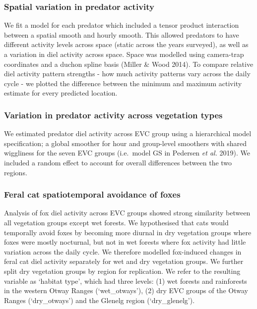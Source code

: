 \documentclass[11pt,a4paper,titlepage,twoside,openright]{style/unimelbthesis}
\begin{document}
\begin{mainmatter}
\hypertarget{spatial-variation-in-predator-activity}{%
\subsubsection{Spatial variation in predator activity}\label{spatial-variation-in-predator-activity}}

We fit a model for each predator which included a tensor product interaction between a spatial smooth and hourly smooth. This allowed predators to have different activity levels across space (static across the years surveyed), as well as a variation in diel activity across space. Space was modelled using camera-trap coordinates and a duchon spline basis (Miller \& Wood 2014). To compare relative diel activity pattern strengths - how much activity patterns vary across the daily cycle - we plotted the difference between the minimum and maximum activity estimate for every predicted location.

\hypertarget{variation-in-predator-activity-across-vegetation-types}{%
\subsubsection{Variation in predator activity across vegetation types}\label{variation-in-predator-activity-across-vegetation-types}}

We estimated predator diel activity across EVC group using a hierarchical model specification; a global smoother for hour and group-level smoothers with shared wiggliness for the seven EVC groups (i.e.~model GS in Pedersen \emph{et al.} 2019). We included a random effect to account for overall differences between the two regions.

\hypertarget{feral-cat-spatiotemporal-avoidance-of-foxes}{%
\subsubsection{Feral cat spatiotemporal avoidance of foxes}\label{feral-cat-spatiotemporal-avoidance-of-foxes}}

Analysis of fox diel activity across EVC groups showed strong similarity between all vegetation groups except wet forests. We hypothesised that cats would temporally avoid foxes by becoming more diurnal in dry vegetation groups where foxes were mostly nocturnal, but not in wet forests where fox activity had little variation across the daily cycle. We therefore modelled fox-induced changes in feral cat diel activity separately for wet and dry vegetation groups. We further split dry vegetation groups by region for replication. We refer to the resulting variable as `habitat type', which had three levels: (1) wet forests and rainforests in the western Otway Ranges (`wet\_otways'), (2) dry EVC groups of the Otway Ranges (`dry\_otways') and the Glenelg region (`dry\_glenelg').


\end{mainmatter}
\end{document}
